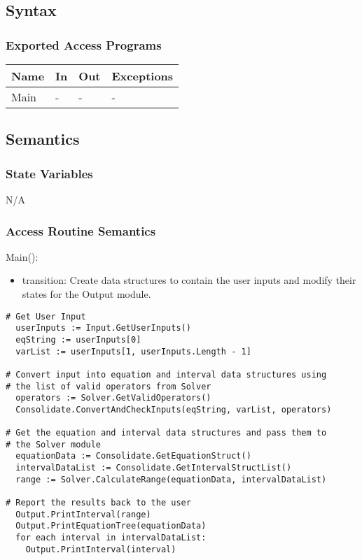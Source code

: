 \documentclass[12pt, titlepage]{article}
\begin{document}
\subsection{Syntax}

\subsubsection{Exported Access Programs}

\begin{center}
\begin{tabular}{p{3cm} p{3cm} p{3cm} p{5cm}}
\hline
\textbf{Name} & \textbf{In} & \textbf{Out} & \textbf{Exceptions} \\
\hline
Main & - & - & - \\
\hline
\end{tabular}
\end{center}

\subsection{Semantics}

\subsubsection{State Variables}

N/A

\subsubsection{Access Routine Semantics}

\noindent Main():
\begin{itemize}
\item transition: Create data structures to contain the user inputs and modify 
their states for the Output module.
\end{itemize}

\begin{lstlisting}
# Get User Input
  userInputs := Input.GetUserInputs()
  eqString := userInputs[0]
  varList := userInputs[1, userInputs.Length - 1]    
 
# Convert input into equation and interval data structures using 
# the list of valid operators from Solver
  operators := Solver.GetValidOperators()
  Consolidate.ConvertAndCheckInputs(eqString, varList, operators)
  
# Get the equation and interval data structures and pass them to 
# the Solver module
  equationData := Consolidate.GetEquationStruct()
  intervalDataList := Consolidate.GetIntervalStructList()
  range := Solver.CalculateRange(equationData, intervalDataList)
  
# Report the results back to the user
  Output.PrintInterval(range)
  Output.PrintEquationTree(equationData)
  for each interval in intervalDataList:
    Output.PrintInterval(interval)
\end{lstlisting}
\end{document}
